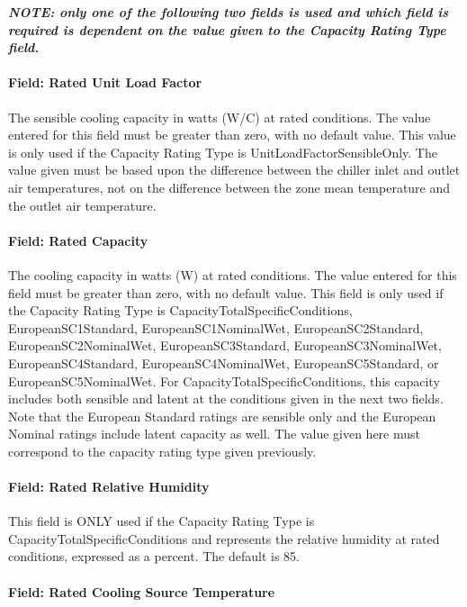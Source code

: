 \textbf{\emph{NOTE: only one of the following two fields is used and which field is required is dependent on the value given to the Capacity Rating Type field.}}

\paragraph{Field: Rated Unit Load Factor}\label{field-rated-unit-load-factor}

The sensible cooling capacity in watts (W/C) at rated conditions. The value entered for this field must be greater than zero, with no default value. This value is only used if the Capacity Rating Type is UnitLoadFactorSensibleOnly. The value given must be based upon the difference between the chiller inlet and outlet air temperatures, not on the difference between the zone mean temperature and the outlet air temperature.

\paragraph{Field: Rated Capacity}\label{field-rated-capacity-001}

The cooling capacity in watts (W) at rated conditions. The value entered for this field must be greater than zero, with no default value. This field is only used if the Capacity Rating Type is CapacityTotalSpecificConditions, EuropeanSC1Standard, EuropeanSC1NominalWet, EuropeanSC2Standard, EuropeanSC2NominalWet, EuropeanSC3Standard, EuropeanSC3NominalWet, EuropeanSC4Standard, EuropeanSC4NominalWet, EuropeanSC5Standard, or EuropeanSC5NominalWet. For CapacityTotalSpecificConditions, this capacity includes both sensible and latent at the conditions given in the next two fields.~ Note that the European Standard ratings are sensible only and the European Nominal ratings include latent capacity as well. The value given here must correspond to the capacity rating type given previously.

\paragraph{Field: Rated Relative Humidity}\label{field-rated-relative-humidity}

This field is ONLY used if the Capacity Rating Type is CapacityTotalSpecificConditions and represents the relative humidity at rated conditions, expressed as a percent. The default is 85.

\paragraph{Field: Rated Cooling Source Temperature}\label{field-rated-cooling-source-temperature-1}


